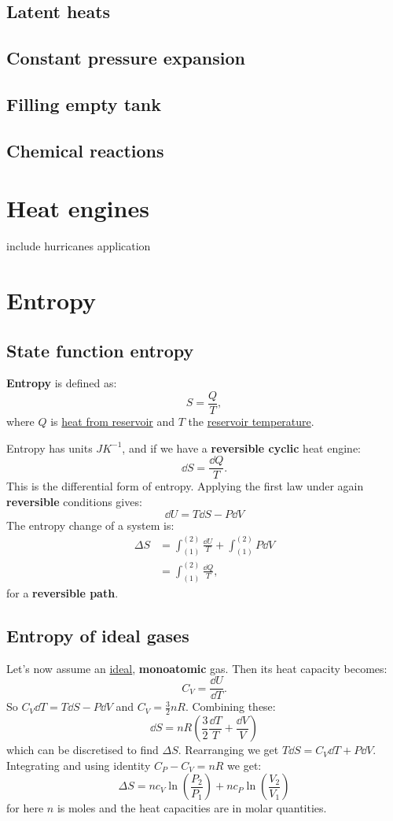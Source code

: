 \documentclass{article}
\begin{document}
\subsection{Latent heats}

\subsection{Constant pressure expansion}

\subsection{Filling empty tank}

\subsection{Chemical reactions}

\newpage

\section{Heat engines}
include hurricanes application

\newpage

\section{Entropy}

\subsection{State function entropy}
\textbf{Entropy} is defined as:
$$S=\frac{Q}{T},$$
where $Q$ is \underline{heat from reservoir} and $T$ the \underline{reservoir temperature}.

Entropy has units $JK^{-1}$, and if we have a \textbf{reversible cyclic} heat engine:
$$\dd S=\frac{\dd Q}{T}.$$
This is the differential form of entropy. Applying the first law under again \textbf{reversible} conditions gives:
$$\dd U=T\dd S-P \dd V$$
The entropy change of a system is:
\begin{align*}
    \Delta S
    &=\int_{(1)}^{(2)}\frac{\dd U}{T}+\int_{(1)}^{(2)}P\dd V \\
    &=\int_{(1)}^{(2)}\frac{\dd Q}{T},
\end{align*}
for a \textbf{reversible path}.

\subsection{Entropy of ideal gases}
Let's now assume an \underline{ideal}, \textbf{monoatomic} gas. Then its heat capacity becomes:
$$C_V=\frac{\dd U}{\dd T}.$$
So $C_V \dd T=T\dd S-P\dd V$ and $C_V=\frac{3}{2}nR$. Combining these:
$$\dd S=nR\left(\frac{3}{2}\frac{\dd T}{T}+\frac{\dd V}{V}\right)$$
which can be discretised to find $\Delta S$. Rearranging we get $T\dd S=C_V \dd T+P \dd V$. Integrating and using identity $C_P-C_V=nR$ we get:
$$\Delta S=nc_V\ln\left(\frac{P_2}{P_1}\right)+nc_P\ln\left(\frac{V_2}{V_1}\right)$$
for here $n$ is moles and the heat capacities are in molar quantities.
\end{document}
